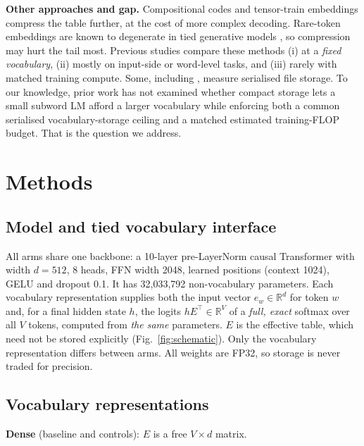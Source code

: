\documentclass[10pt,a4paper]{article}
\begin{document}
\textbf{Other approaches and gap.} Compositional codes \citep{shu2018compositional} and tensor-train
embeddings \citep{hrinchuk2020tensorized} compress the table further, at the cost of more complex
decoding. Rare-token embeddings are known to degenerate in tied generative models \citep{gao2019degeneration},
so compression may hurt the tail most. Previous studies compare these methods (i) at a \emph{fixed
vocabulary}, (ii) mostly on input-side or word-level tasks, and (iii) rarely with matched training compute.
Some, including \citet{shu2018compositional}, measure serialised file storage. To our knowledge, prior work has not examined whether compact storage lets a small
subword LM afford a larger vocabulary while enforcing both a common serialised vocabulary-storage ceiling and a matched estimated training-FLOP budget. That is the question we address.

\section{Methods}
\label{sec:methods}

\subsection{Model and tied vocabulary interface}
All arms share one backbone: a 10-layer pre-LayerNorm \citep{xiong2020preln} causal Transformer
\citep{vaswani2017attention} with width $d=512$, 8 heads, FFN width 2048, learned positions (context
1024), GELU and dropout 0.1. It has 32,033,792 non-vocabulary parameters. Each vocabulary
representation supplies both the input vector $e_w\in\mathbb{R}^{d}$ for token $w$ and, for a final hidden
state $h$, the logits $hE^{\top}\in\mathbb{R}^{V}$ of a \emph{full, exact} softmax over all $V$ tokens, computed
from \emph{the same} parameters. $E$ is the effective table, which need not be stored explicitly
(Fig.~\ref{fig:schematic}). Only the vocabulary representation differs between arms. All weights
are FP32, so storage is never traded for precision.

\subsection{Vocabulary representations}
\label{sec:reps}

\textbf{Dense} (baseline and controls): $E$ is a free $V\times d$ matrix.
\end{document}

